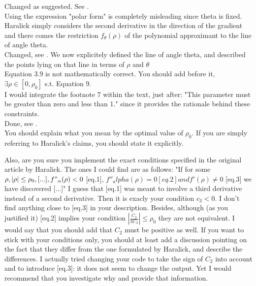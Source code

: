 \documentclass[a4paper,10pt]{report}
\begin{document}
\ans Changed as suggested. See .\\

\que Using the expression "polar form" is completely misleading since theta is
fixed. Haralick simply considers the second derivative in the direction of the
gradient and there comes the restriction $f_\theta(\rho)$ of the polynomial
approximant to the line of angle theta.\\

\ans Changed, see . We now explicitely defined the line of angle theta, and described the points lying on that line in terms of $\rho$ and $\theta$\\

\que Equation 3.9 is not mathematically correct. You should add before it, $\exists
\rho\in[0,\rho_0]$ s.t. Equation 9.\\

\que I would integrate the footnote 7 within the text, just after: "This parameter
must be greater than zero and less
than 1." since it provides the rationale behind these constraints.\\

\ans Done, see .\\

You should explain what you mean by the optimal value of $\rho_0$. If you are
simply referring to Haralick's claims, you should state it explicitly.

Also, are you sure you implement the exact conditions specified in the
original article by Haralick. The ones I could find are as follows:
"If for some $\rho, |\rho|\leq\rho_0, [...], f"_\alpha(\rho)<0$ [eq.1],
$f''_alpha(\rho)=0 [eq.2] and f'(\rho)\neq 0$ [eq.3] we have discovered [...]"
I guess that [eq.1] was meant to involve a third derivative instead of a second
derivative. Then it is exacly your condition $c_3<0$. I don't find anything
close to [eq.3] in your description. Besides, although (as you justified it)
[eq.2] implies your condition $|\frac{C_2}{3C_3}|\leq\rho_0$ they are not
equivalent. I would say that you should add that $C_2$ must be positive as well. If you want to stick with your conditions only, you should at least add a discussion pointing on the fact that they differ from the one formulated by Haralick, and
describe the differences. I actually tried changing your code to take the
sign of $C_2$ into account and to introduce [eq.3]: it does not seem to change
the output. Yet I would recommend that you investigate why and provide that
information.
\end{document}
